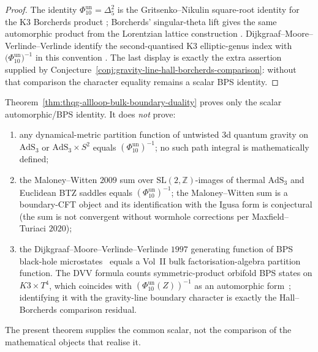 \begin{proof}
The identity $\Phi_{10}^{\mathrm{un}}=\Delta_5^2$ is the
Gritsenko--Nikulin square-root identity for the K3 Borcherds product
\cite{GritsenkoNikulin1998}; Borcherds' singular-theta lift gives the
same automorphic product from the Lorentzian lattice construction
\cite{Borcherds1998}. Dijkgraaf--Moore--Verlinde--Verlinde identify
the second-quantised K3 elliptic-genus index with
$\bigl(\Phi_{10}^{\mathrm{un}}\bigr)^{-1}$ in this convention
\cite{DijkgraafMooreVerlindeVerlinde1997}. The last display is exactly
the extra assertion supplied by
Conjecture~\ref{conj:gravity-line-hall-borcherds-comparison}: without
that comparison the character equality remains a scalar BPS identity.
\end{proof}

\begin{remark}
\label{rem:thqg-allloop-scope}
Theorem~\ref{thm:thqg-allloop-bulk-boundary-duality} proves only the
scalar automorphic/BPS identity. It does \emph{not} prove:
\begin{enumerate}[label=\textup{(\alph*)}]
\item any dynamical-metric partition function of untwisted $3$d
 quantum gravity on $\mathrm{AdS}_3$ or
 $\mathrm{AdS}_3 \times S^2$ equals
 $(\Phi_{10}^{\mathrm{un}})^{-1}$; no such path
 integral is mathematically defined;
\item the Maloney--Witten $2009$ sum over $\mathrm{SL}(2,
 \mathbb{Z})$-images of thermal $\mathrm{AdS}_3$ and Euclidean BTZ
 saddles equals $(\Phi_{10}^{\mathrm{un}})^{-1}$; the Maloney--Witten sum is a
 boundary-CFT object and its identification with the Igusa form
 is conjectural (the sum is not convergent without
 wormhole corrections per Maxfield--Turiaci $2020$);
\item the Dijkgraaf--Moore--Verlinde--Verlinde $1997$ generating
 function of BPS black-hole microstates~\cite{DijkgraafMooreVerlindeVerlinde1997}
 equals a Vol~II bulk factorisation-algebra partition function. The DVV
 formula counts symmetric-product orbifold BPS states on $K3 \times
 T^4$, which coincides with $(\Phi_{10}^{\mathrm{un}}(Z))^{-1}$ as an automorphic
 form~\cite{MaldacenaMooreStrominger1999}; identifying it with the
 gravity-line boundary character is exactly the Hall--Borcherds
 comparison residual.
\end{enumerate}
The present theorem supplies the common scalar, not the comparison of
the mathematical objects that realise it.
\end{remark}

